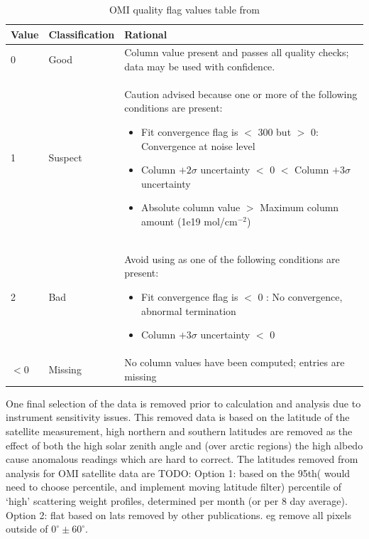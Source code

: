     \begin{table}[H]
    \begin{tabular}{ | l | l | p{10cm} |}
      \hline
      \textbf{Value} & \textbf{Classification} & \textbf{Rational} 
      \\ \hline
      0 & Good & Column value present and passes all quality checks; data may be used with confidence. 
      \\ \hline
      1 & Suspect & Caution advised because one or more of the following conditions are present: 
        \begin{itemize}
          \item Fit convergence flag is $<$ 300 but $>$ 0: Convergence at noise level
          \item Column $+ 2 \sigma$ uncertainty $<$ 0 $<$ Column $ + 3 \sigma $ uncertainty
          \item Absolute column value $>$ Maximum column amount (1e19 mol/cm$^{-2}$)
        \end{itemize}
      \\ \hline
      2 & Bad & Avoid using as one of the following conditions are present: 
        \begin{itemize}
          \item Fit convergence flag is $<$ 0 : No convergence, abnormal termination
          \item Column $+ 3 \sigma$ uncertainty $<$ 0
        \end{itemize}
      \\ \hline
      $<0$ & Missing & No column values have been computed; entries are missing
      \\ \hline
    \end{tabular}
    \caption{OMI quality flag values table from \citet{OMI_Readme}}
    \label{ch_isop:tab:OMIQualityFlag}
    \end{table}
    
  One final selection of the data is removed prior to calculation and analysis due to instrument sensitivity issues.
  This removed data is based on the latitude of the satellite measurement, high northern and southern latitudes are removed as the effect of both the high solar zenith angle and (over arctic regions) the high albedo cause anomalous readings which are hard to correct.
  The latitudes removed from analysis for OMI satellite data are TODO:
  Option 1: based on the 95th( would need to choose percentile, and implement moving latitude filter) percentile of `high' scattering weight profiles, determined per month (or per 8 day average).
  Option 2: flat based on lats removed by other publications. eg remove all pixels outside of $0^\circ \pm 60^\circ$.
  
